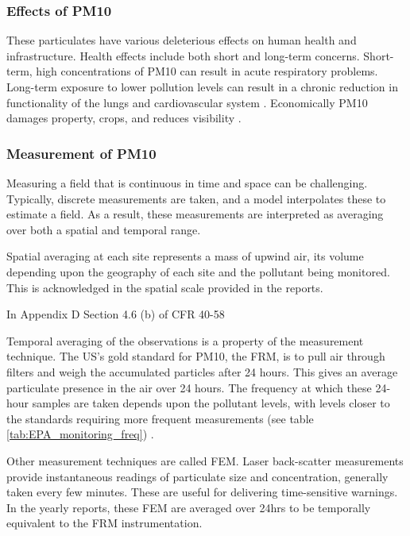 \documentclass{article}
\begin{document}
	\subsubsection*{Effects of PM10}
	\label{subsubsec:pm10effects}
	These particulates have various deleterious effects on human health and infrastructure.  Health effects include both short and long-term concerns.  Short-term, high concentrations of \ac{PM10} can result in acute respiratory problems.  Long-term exposure to lower pollution levels can result in a chronic reduction in functionality of the lungs and cardiovascular system %
	.  Economically \ac{PM10} damages property, crops, and reduces visibility
	.
	
	\subsubsection*{Measurement of PM10}
	\label{subsubsec:pm10measurement}
	Measuring a field that is continuous in time and space can be challenging.  Typically, discrete measurements are taken, and a model interpolates these to estimate a field.  As a result, these measurements are interpreted as averaging over both a spatial and temporal range.
	
	Spatial averaging at each site represents a mass of upwind air, its volume depending upon the geography of each site and the pollutant being monitored.  This is acknowledged in the spatial scale provided in the reports.   
	
	In Appendix D Section 4.6 (b) of CFR 40-58 %
	
	
	Temporal averaging of the observations is a property of the measurement technique.  The US's gold standard for \ac{PM10}, the \ac{FRM}, is to pull air through filters and weigh the accumulated particles after 24 hours.  This gives an average particulate presence in the air over 24 hours.  The frequency at which these 24-hour samples are taken depends upon the pollutant levels, with levels closer to the standards requiring more frequent measurements (see table \ref{tab:EPA_monitoring_freq}) 
	\citep{CASCAQMD:2015}.
	
	Other measurement techniques are called \ac{FEM}.  Laser back-scatter measurements provide instantaneous readings of particulate size and concentration, generally taken every few minutes.  These are useful for delivering time-sensitive warnings.  In the yearly reports, these \ac {FEM} are averaged over 24hrs to be temporally equivalent to the \ac{FRM} instrumentation.
	
\end{document}
